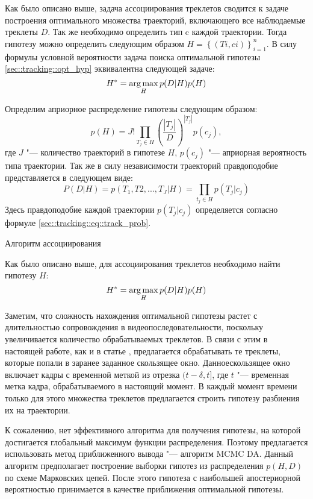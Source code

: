 Как было описано выше, задача ассоциирования треклетов сводится к задаче построения оптимального множества траекторий, включающего все наблюдаемые треклеты $D$. Так же необходимо определить тип c каждой траектории. Тогда гипотезу можно определить следующим образом $H = \left\{\left(T i , c i \right)\right\}^n_{i=1}$. В силу формулы условной вероятности задача поиска оптимальной гипотезы \eqref{sec::tracking::opt_hyp} эквивалентна следующей задаче:
\begin{equation}
H^* = \operatorname*{arg\,max}_H p(D|H)p(H)
\end{equation}

Определим априорное распределение гипотезы следующим образом:
\begin{equation}
	p(H) = J!\prod_{T_j \in H}\left(\frac{\left|T_j\right|}{D}\right)^{\left|T_j\right|}p(c_j),
\end{equation}
где $J$ "--- количество траекторий в гипотезе $H$, $p(c_j)$ "--- априорная вероятность типа траектории. Так же в силу независимости траекторий правдоподобие представляется в
следующем виде:
\begin{equation}
	P(D|H) = p(T_1, T2, ..., T_J|H) = \prod_{t_j\in H}p(T_j|c_j)
\end{equation}
Здесь правдоподобие каждой траектории $p(T_j|c_j)$ определяется согласно формуле \eqref{sec::tracking::eq::track_prob}.

Алгоритм ассоциирования

Как было описано выше, для ассоциирования треклетов необходимо найти гипотезу $H$:
\begin{equation}
	H^* = \operatorname*{arg\,max}_H p(D|H)p(H)
\end{equation}

Заметим, что сложность нахождения оптимальной гипотезы растет с длительностью сопровождения в видеопоследовательности, поскольку увеличивается количество обрабатываемых треклетов. В связи с этим в настоящей работе, как и в статье \cite{benfold2011stable}, предлагается обрабатывать те треклеты, которые попали в заранее заданное скользящее окно. Данноескользящее окно включает кадры с временной меткой из отрезка $(t - \delta, t]$, где $t$ "--- временная метка кадра, обрабатываемого в настоящий момент. В каждый момент времени только для этого множества треклетов предлагается строить гипотезу разбиения их на траектории.

К сожалению, нет эффективного алгоритма для получения гипотезы, на которой достигается глобальный максимум функции распределения. Поэтому предлагается использовать метод приближенного вывода "--- алгоритм MCMC DA. Данный алгоритм предполагает построение выборки гипотез из распределения $p(H, D)$ по схеме Марковских цепей. После этого гипотеза с наибольшей апостериорной вероятностью принимается в качестве приближения оптимальной гипотезы.

